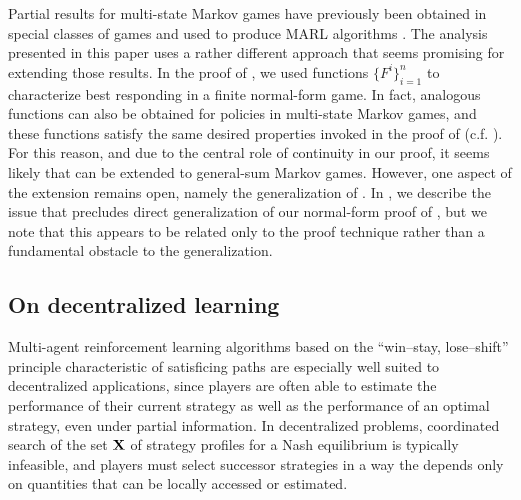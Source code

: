 {{Partial results for multi-state Markov games have previously been obtained in special classes of games and used to produce MARL algorithms \cite{yongacoglu2023satisficing}. The analysis presented in this paper uses a rather different approach that seems promising for extending those results.} In the proof of , we used functions $\{ F^i \}_{i=1}^n$ to characterize best responding in a finite normal-form game. In fact, analogous functions can also be obtained for policies in multi-state Markov games, and these functions satisfy the same desired properties invoked in the proof of  (c.f. \cite[Lemmas 2.10-2.13]{yongacoglu2023satisficing}). For this reason, and due to the central role of continuity in our proof, it seems likely that  can be extended to general-sum Markov games. However, one aspect of the extension remains open, namely the generalization of . {In , we describe the issue that precludes direct generalization of our normal-form proof of , but we note that this appears to be related only to the proof technique rather than a fundamental obstacle to the generalization.}







\subsection*{On decentralized learning}

Multi-agent reinforcement learning algorithms based on the ``win--stay, lose--shift'' principle characteristic of satisficing paths are especially well suited to decentralized applications, since players are often able to estimate the performance of their current strategy as well as the performance of an optimal strategy, even under partial information. In decentralized problems, coordinated search of the set ${\mathbf{X}}$ of strategy profiles for a Nash equilibrium is typically infeasible, and players must select successor strategies in a way the depends only on quantities that can be locally accessed or estimated. 

}
